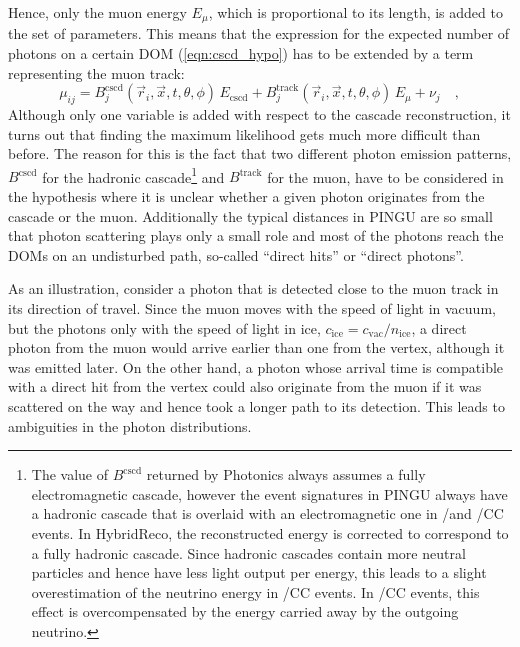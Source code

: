 Hence, only the muon energy $E_\mu$, which is proportional to its length, is
added to the set of parameters.
This means that the expression for the expected number of photons on a certain
DOM (\ref{eqn:cscd_hypo}) has to be extended by a term representing the muon
track:
\begin{equation}
  \mu_{ij} = B^\mathrm{cscd}_j(\vec{r}_i, \vec{x}, t, \theta,\phi)
              \,E_\mathrm{cscd}
   + B^\mathrm{track}_j(\vec{r}_i, \vec{x}, t, \theta, \phi)\,E_\mu
   + \nu_j \quad, \label{eqn:hybrid_hypo}
\end{equation}
Although only one variable is added with respect to the cascade reconstruction,
it turns out that finding the maximum likelihood gets much more difficult than
before. The reason for this is the fact that two different photon emission
patterns, $B^\mathrm{cscd}$ for the hadronic cascade\footnote{The value of
$B^\mathrm{cscd}$ returned by Photonics always assumes a fully electromagnetic
cascade, however the event signatures in PINGU always have a hadronic cascade
that is overlaid with an electromagnetic one in \nue/\nuebar and
\nutau/\nutaubar CC events. In HybridReco, the reconstructed energy is
corrected to correspond to a fully hadronic cascade. Since hadronic cascades
contain more neutral particles and hence have less light output per energy,
this leads to a slight overestimation of the neutrino energy in \nue/\nuebar CC
events. In \nutau/\nutaubar CC events, this effect is overcompensated by the
energy carried away by the outgoing neutrino.} and $B^\mathrm{track}$ for
the muon, have to be considered in the hypothesis where it is unclear whether a
given photon originates from the cascade or the muon. Additionally the typical
distances in PINGU are so small that photon scattering plays only a small role
and most of the photons reach the DOMs on an undisturbed path, so-called
``direct hits'' or ``direct photons''.

As an illustration, consider a photon that is detected close to the muon track
in its direction of travel. Since the muon moves with the speed of light in
vacuum, but the photons only with the speed of light in ice, $c_\mathrm{ice} =
c_\mathrm{vac}/n_\mathrm{ice}$, a direct photon from the muon would arrive
earlier than one from the vertex, although it was emitted later. On the other
hand, a photon whose arrival time is compatible with a direct hit from the
vertex could also originate from the muon if it was scattered on the way and
hence took a longer path to its detection. This leads to ambiguities in the
photon distributions.

